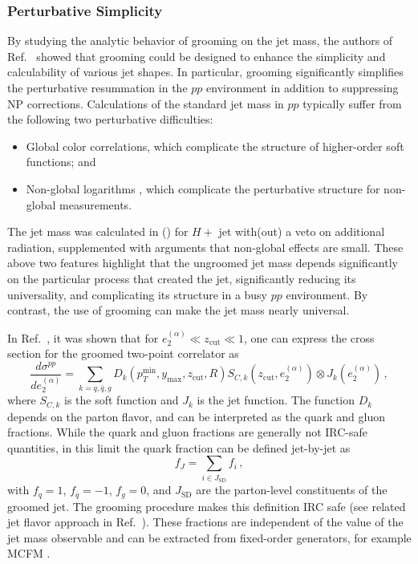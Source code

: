 \documentclass[11pt]{cernrep}
\begin{document}
\subsubsection{Perturbative Simplicity}
\label{jetsub_alphas_sec:pertsimplicity}

By studying the analytic behavior of grooming on the jet mass, the authors of Ref.~\cite{Dasgupta:2013ihk} showed that grooming could be designed to enhance the simplicity and calculability of various jet shapes.
%
In particular, grooming significantly simplifies the perturbative resummation in the $pp$ environment in addition to suppressing NP corrections.
%
Calculations of the standard jet mass in $pp$ typically suffer from the following two perturbative difficulties:
%
\begin{itemize}
%
\item Global color correlations, which complicate the structure of higher-order soft functions; and
%
\item Non-global logarithms \cite{Dasgupta:2001sh}, which complicate the perturbative structure for non-global measurements.
%
\end{itemize}
%
The jet mass was calculated in \cite{Jouttenus:2013hs} (\cite{arXiv:1207.1640}) for $H+$ jet with(out) a veto on additional radiation, supplemented with arguments that non-global effects are small.
%
These above two features highlight that the ungroomed jet mass depends significantly on the particular process that created the jet, significantly reducing its universality, and complicating its structure in a busy $pp$ environment.
%
By contrast, the use of grooming can make the jet mass nearly universal.

In Ref.~\cite{Frye:2016aiz}, it was shown that for $e_2^{(\alpha)}\ll z_{\mathrm{cut}}  \ll 1$, one can express the cross section for the groomed two-point correlator as
%
\begin{equation}
\label{jetsub_alphas_eq:fac_pp_e2}
\frac{d\sigma^{pp}}{de_2^{(\alpha)}}=\sum\limits_{k=q,\bar q, g}D_k(p_T^{\mathrm{min}}, y_\mathrm{max}, z_{\mathrm{cut}} , R) S_{C,k}(z_{\mathrm{cut}} , e_2^{(\alpha)})\otimes J_k (e_2^{(\alpha)})\,,
\end{equation}
%
where $S_{C,k}$ is the soft function and $J_k$ is the jet function.
%
The function $D_k$ depends on the parton flavor, and can be interpreted as the quark and gluon fractions.
%
While the quark and gluon fractions are generally not IRC-safe quantities, in this limit the quark fraction can be defined jet-by-jet as 
\begin{equation}
f_J=\sum\limits_{i\in J_{\mathrm{SD}}} f_i\,,
\end{equation}
with $f_q=1$, $f_{\bar q}=-1$, $f_g=0$, and $J_{\mathrm{SD}}$ are the parton-level constituents of the groomed jet.
%
The grooming procedure makes this definition IRC safe (see related jet flavor approach in Ref.~\cite{Banfi:2006hf}).
%
These fractions are independent of the value of the jet mass observable and can be extracted from fixed-order generators, for example MCFM \cite{Campbell:1999ah,Campbell:2010ff,Campbell:2011bn}.
\end{document}
